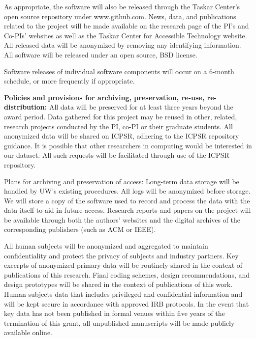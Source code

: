 As appropriate, the software will also be released through the Taskar Center's  open source repository under www.github.com. News, data, and publications related to the project will be made available on the research page of the PI’s and Co-PIs’ websites as well as the Taskar Center for Accessible Technology website. All released data will be anonymized by removing any identifying information. All software will be released under an open source, BSD license. 

Software releases of individual software components will occur on a 6-month schedule, or more frequently if appropriate. 

\textbf{Policies and provisions for archiving, preservation, re-use, re-distribution:} All data will be preserved for at least three years beyond the award period. Data gathered for this project may be reused in other, related, research projects conducted by the PI, co-PI or their graduate students. All anonymized data will be shared on ICPSR, adhering to the ICPSR repository guidance.  It is possible that other researchers in computing would be interested in our dataset. All such requests will be facilitated through use of the ICPSR repository.

Plans for archiving and preservation of access: 
Long-term data storage will be handled by UW’s existing procedures. All logs will be anonymized before storage. We will store a copy of the software used to record and process the data with the data itself to aid in future access. Research reports and papers on the project will be available through both the authors' websites and the digital archives of the corresponding publishers (such as ACM or IEEE). 


All human subjects will be anonymized and aggregated to maintain confidentiality  and protect the privacy of subjects and industry partners. Key excerpts of anonymized primary data will be routinely shared in the context of publications of this research.  
Final coding schemes, design recommendations, and design prototypes will be shared in the context of publications of this work. Human subjects data that includes privileged and confidential information 
and will be kept secure in accordance with approved IRB protocols. 
In the event that key data has not been published in formal venues within five years of the termination of this grant, 
all unpublished manuscripts will be made publicly available online.
